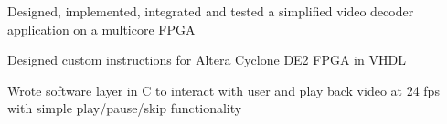 \documentclass[]{deedy-resume}
\begin{document}
\begin{minipage}[t]{0.66\textwidth}
\begin{tightemize}
\item Designed, implemented, integrated and tested a simplified video decoder application on a multicore FPGA
\item Designed custom instructions for Altera Cyclone DE2 FPGA in VHDL
\item Wrote software layer in C to interact with user and play back video at 24 fps with simple play/pause/skip functionality
\end{tightemize}

\sectionsep

\end{minipage} 
\end{document}
